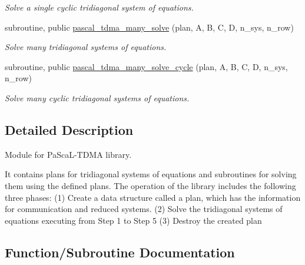 \begin{DoxyCompactItemize}
\begin{DoxyCompactList}\small\item\em Solve a single cyclic tridiagonal system of equations. \end{DoxyCompactList}\item 
subroutine, public \hyperlink{namespacepascal__tdma_afa0c78b8377f5fe1059907befda3c940}{pascal\+\_\+tdma\+\_\+many\+\_\+solve} (plan, A, B, C, D, n\+\_\+sys, n\+\_\+row)
\begin{DoxyCompactList}\small\item\em Solve many tridiagonal systems of equations. \end{DoxyCompactList}\item 
subroutine, public \hyperlink{namespacepascal__tdma_acbaed65e67ecbfd92a8f1d51d1b69fd5}{pascal\+\_\+tdma\+\_\+many\+\_\+solve\+\_\+cycle} (plan, A, B, C, D, n\+\_\+sys, n\+\_\+row)
\begin{DoxyCompactList}\small\item\em Solve many cyclic tridiagonal systems of equations. \end{DoxyCompactList}\end{DoxyCompactItemize}


\subsection{Detailed Description}
Module for Pa\+Sca\+L-\/\+T\+D\+MA library. 

It contains plans for tridiagonal systems of equations and subroutines for solving them using the defined plans. The operation of the library includes the following three phases\+: (1) Create a data structure called a plan, which has the information for communication and reduced systems. (2) Solve the tridiagonal systems of equations executing from Step 1 to Step 5 (3) Destroy the created plan 

\subsection{Function/\+Subroutine Documentation}
\mbox{\label{namespacepascal__tdma_afa0c78b8377f5fe1059907befda3c940}} 
